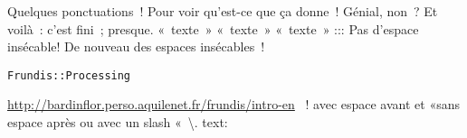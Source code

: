 Quelques ponctuations~! Pour voir qu’est-ce que ça donne~! Génial, non~?
Et voilà~: c’est fini~; presque.
«~texte~»
«~texte~»
«~texte~»
:::
Pas d’espace insécable!
De nouveau des espaces insécables~!

\begin{verbatim}
Frundis::Processing
\end{verbatim}
\url{http://bardinflor.perso.aquilenet.fr/frundis/intro-en}
~! avec espace avant et «sans espace après ou avec un slash «~\textbackslash{}.
text:

